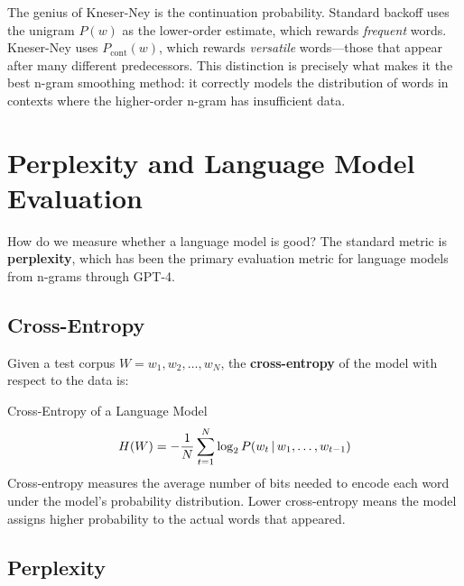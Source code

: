 \begin{keyinsight}
The genius of Kneser-Ney is the continuation probability.  Standard backoff
uses the unigram $P(w)$ as the lower-order estimate, which rewards \emph{frequent}
words.  Kneser-Ney uses $P_{\text{cont}}(w)$, which rewards \emph{versatile}
words---those that appear after many different predecessors.  This distinction
is precisely what makes it the best n-gram smoothing method: it correctly
models the distribution of words in contexts where the higher-order n-gram
has insufficient data.
\end{keyinsight}


\section{Perplexity and Language Model Evaluation}
\label{sec:perplexity}

How do we measure whether a language model is good?  The standard metric is
\textbf{perplexity}, which has been the primary evaluation metric for language
models from n-grams through GPT-4.

\subsection{Cross-Entropy}

Given a test corpus $W = w_1, w_2, \ldots, w_N$, the \textbf{cross-entropy}
of the model with respect to the data is:

\begin{mathresult}{Cross-Entropy of a Language Model}
\begin{equation}
H(W) = -\frac{1}{N} \sum_{t=1}^{N} \log_2 P(w_t \,|\, w_1, \ldots, w_{t-1})
\label{eq:cross_entropy_lm}
\end{equation}
Cross-entropy measures the average number of bits needed to encode each word
under the model's probability distribution.  Lower cross-entropy means the
model assigns higher probability to the actual words that appeared.
\end{mathresult}

\subsection{Perplexity}

